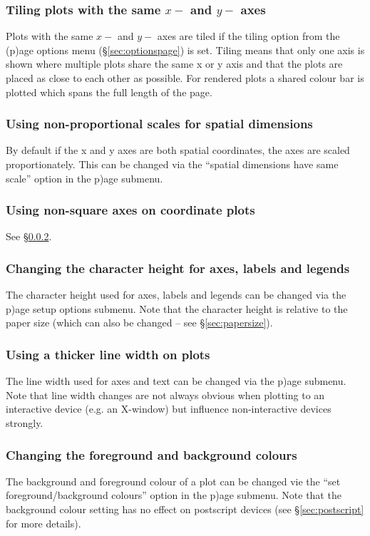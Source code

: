 \documentclass[a4paper,10pt]{article}
\begin{document}
\subsubsection{ Tiling plots with the same $x-$ and $y-$ axes}
\label{sec:tiling}
 Plots with the same $x-$ and $y-$ axes are tiled if the tiling
option from the (p)age options menu (\S\ref{sec:optionspage}) is set. Tiling means that only one axis is shown where multiple plots share the same x or y axis and that the plots are placed as close to each other as possible. For rendered plots a shared colour bar is plotted which spans the full length of the page.

\subsubsection{ Using non-proportional scales for spatial dimensions}
\label{sec:squarexy}
 By default if the x and y axes are both spatial coordinates, the axes are scaled proportionately. This can be changed via the ``spatial dimensions have same scale'' option in the p)age submenu.

\subsubsection{ Using non-square axes on coordinate plots}
 See \S\ref{sec:squarexy}.
 
\subsubsection{ Changing the character height for axes, labels and legends}
 The character height used for axes, labels and legends can be changed via the p)age setup options submenu. Note that the character height is relative to the paper size (which can also be changed -- see \S\ref{sec:papersize}).

\subsubsection{ Using a thicker line width on plots}
 The line width used for axes and text can be changed via the p)age submenu. Note that line width changes are not always obvious when plotting to an interactive device (e.g. an X-window) but influence non-interactive devices strongly.
 
\subsubsection{ Changing the foreground and background colours}
\label{sec:pagecolours}
 The background and foreground colour of a plot can be changed vie the ``set foreground/background colours'' option in the p)age submenu. Note that the background colour setting has no effect on postscript devices (see \S\ref{sec:postscript} for more details).
\end{document}
